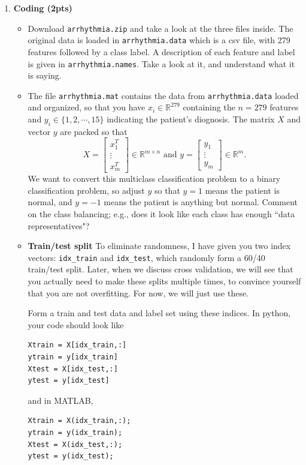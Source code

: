 \documentclass{article}
\newcommand{\R}{\mathbb R}
\newcommand{\bmat}{\left[\begin{matrix}}
\newcommand{\emat}{\end{matrix}\right]}
\begin{document}
\begin{enumerate}
\begin{enumerate}
\item \textbf{Coding (2pts)} 
\begin{itemize}
\item Download \texttt{arrhythmia.zip} and take a look at the three files inside. The original data is loaded in \texttt{arrhythmia.data} which is a csv file, with 279 features followed by a class label. A description of each feature and label is given in \texttt{arrhythmia.names}. 
Take a look at it, and understand what it is saying.

\item The file \texttt{arrhythmia.mat} contains the data from \texttt{arrhythmia.data} loaded and organized, so that you have 
$x_i \in \R^{279}$ containing the $n = 279$ features  and $y_i \in \{1,2,\cdots,15\}$ indicating the patient's diognosis. The matrix $X$ and vector $y$ are packed so that
\[
X = \bmat x_1^T \\ \vdots \\x_m^T\emat \in \R^{m\times n} \text{ and } y = \bmat y_1 \\ \vdots \\ y_m \emat \in \R^m.
\]
We want to convert this multiclass classification problem to a binary classification problem, so adjust $y$ so that $y = 1$ means the patient is normal, and $y = -1$ means the patient is anything but normal. Comment on the class balancing; e.g., does it look like each class has enough ``data representatives"?


\item \textbf{Train/test split} To eliminate randomness, I have given you two index vectors: \texttt{idx\_train} and \texttt{idx\_test}, which randomly form a 60/40 train/test split. Later, when we discuss cross validation, we will see that you actually need to make these splits multiple times, to convince yourself that you are not overfitting. For now, we will just use these. 

Form a train and test data and label set using these indices. In python, your code should look like 

\begin{verbatim}
Xtrain = X[idx_train,:]
ytrain = y[idx_train]
Xtest = X[idx_test,:]
ytest = y[idx_test]
\end{verbatim}

and in MATLAB,

\begin{verbatim}
Xtrain = X(idx_train,:);
ytrain = y(idx_train);
Xtest = X(idx_test,:);
ytest = y(idx_test);
\end{verbatim}




\end{itemize}
\end{enumerate}
\end{enumerate}
\end{document}
